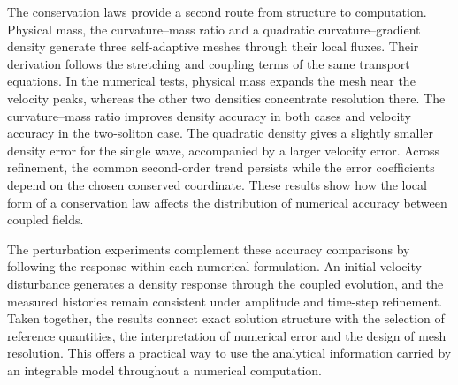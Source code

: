 \documentclass[11pt,a4paper]{article}
\begin{document}
The conservation laws provide a second route from structure to computation. Physical mass, the curvature--mass ratio and a quadratic curvature--gradient density generate three self-adaptive meshes through their local fluxes. Their derivation follows the stretching and coupling terms of the same transport equations. In the numerical tests, physical mass expands the mesh near the velocity peaks, whereas the other two densities concentrate resolution there. The curvature--mass ratio improves density accuracy in both cases and velocity accuracy in the two-soliton case. The quadratic density gives a slightly smaller density error for the single wave, accompanied by a larger velocity error. Across refinement, the common second-order trend persists while the error coefficients depend on the chosen conserved coordinate. These results show how the local form of a conservation law affects the distribution of numerical accuracy between coupled fields.

The perturbation experiments complement these accuracy comparisons by following the response within each numerical formulation. An initial velocity disturbance generates a density response through the coupled evolution, and the measured histories remain consistent under amplitude and time-step refinement. Taken together, the results connect exact solution structure with the selection of reference quantities, the interpretation of numerical error and the design of mesh resolution. This offers a practical way to use the analytical information carried by an integrable model throughout a numerical computation.
\end{document}
